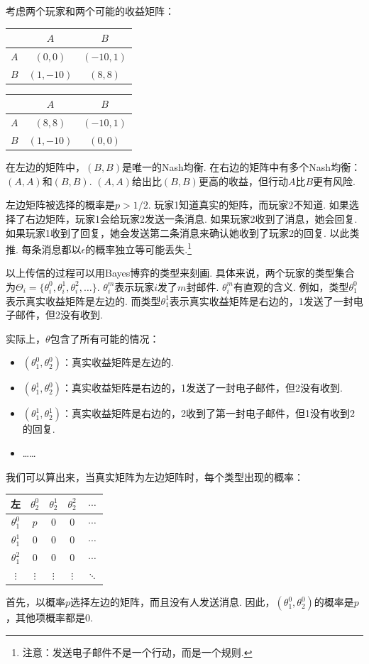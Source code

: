 考虑两个玩家和两个可能的收益矩阵：
\begin{table}[ht]
    \centering
\begin{tabular}{c|cc}
&$A$ & $B$ \\
\hline
$A$ & $(0, 0)$ & $(-10, 1)$ \\
$B$ & $(1, -10)$ & $(8, 8)$ \\
\end{tabular}
\qquad
\begin{tabular}{c|cc}
&$A$ & $B$ \\
\hline
$A$ & $(8, 8)$ & $(-10, 1)$ \\
$B$ & $(1, -10)$ & $(0, 0)$ \\
\end{tabular}
\end{table}

在左边的矩阵中，$(B,B)$是唯一的Nash均衡. 在右边的矩阵中有多个Nash均衡：$(A,A)$和$(B,B)$. $(A,A)$给出比$(B,B)$更高的收益，但行动$A$比$B$更有风险.

左边矩阵被选择的概率是$p>1/2$. 玩家1知道真实的矩阵，而玩家2不知道. 如果选择了右边矩阵，玩家1会给玩家2发送一条消息. 如果玩家2收到了消息，她会回复. 如果玩家1收到了回复，她会发送第二条消息来确认她收到了玩家2的回复. 以此类推.  每条消息都以$\epsilon$的概率独立等可能丢失.\footnote{注意：发送电子邮件不是一个行动，而是一个规则.}  

以上传信的过程可以用Bayes博弈的类型来刻画. 具体来说，两个玩家的类型集合为$\Theta_i = \{\theta_i^0, \theta_i^1, \theta_i^2, \dots\}$. $\theta_i^m$表示玩家$i$发了$m$封邮件. $\theta_i^m$有直观的含义. 例如，类型$\theta_1^0$表示真实收益矩阵是左边的.  而类型$\theta_1^1$表示真实收益矩阵是右边的，1发送了一封电子邮件，但2没有收到. 

实际上，$\theta$包含了所有可能的情况：
\begin{itemize}
\item $(\theta_1^0, \theta_2^0)$：真实收益矩阵是左边的. 
\item $(\theta_1^1, \theta_2^0)$：真实收益矩阵是右边的，1发送了一封电子邮件，但2没有收到. 
\item $(\theta_1^1, \theta_2^1)$：真实收益矩阵是右边的，2收到了第一封电子邮件，但1没有收到2的回复. 
\item ……
\end{itemize}

我们可以算出来，当真实矩阵为左边矩阵时，每个类型出现的概率：
\begin{table}[ht]
    \centering
\begin{tabular}{c|cccc}
左& $\theta_2^0$ & $\theta_2^1$ & $\theta_2^2$ & $\cdots$ \\
\hline
$\theta_1^0$ & $p$ & $0$ & $0$ & $\cdots$ \\
$\theta_1^1$ & $0$ & $0$ & $0$ & $\cdots$ \\
$\theta_1^2$ & $0$ & $0$ & $0$ & $\cdots$ \\
$\vdots$ & $\vdots$ & $\vdots$ & $\vdots$ & $\ddots$
\end{tabular}
\end{table}
首先，以概率$p$选择左边的矩阵，而且没有人发送消息. 因此，$(\theta_1^0,\theta_2^0)$的概率是$p$，其他项概率都是$0$.

